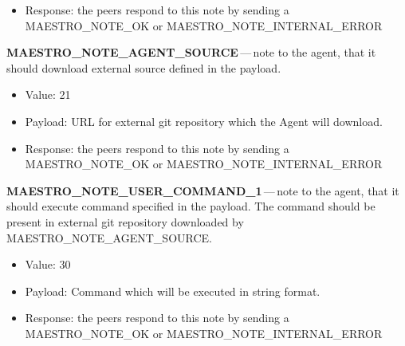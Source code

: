 \begin{description}
\begin{itemize}
    \item Response: the peers respond to this note by sending a MAESTRO\_NOTE\_OK or MAESTRO\_NOTE\_INTERNAL\_ERROR
  \end{itemize}
  \item \textbf{MAESTRO\_NOTE\_AGENT\_SOURCE}\,---\,note to the agent, that it should download external source defined in the payload.
  \begin{itemize}
    \setlength\itemsep{0em}
    \item Value: 21
    \item Payload: URL for external git repository which the Agent will download.
    \item Response: the peers respond to this note by sending a MAESTRO\_NOTE\_OK or MAESTRO\_NOTE\_INTERNAL\_ERROR
  \end{itemize}
  \item \textbf{MAESTRO\_NOTE\_USER\_COMMAND\_1}\,---\,note to the agent, that it should execute command specified in the payload. The command should be present in external git repository downloaded by MAESTRO\_NOTE\_AGENT\_SOURCE.
  \begin{itemize}
    \setlength\itemsep{0em}
    \item Value: 30
    \item Payload: Command which will be executed in string format.
    \item Response: the peers respond to this note by sending a MAESTRO\_NOTE\_OK or MAESTRO\_NOTE\_INTERNAL\_ERROR
  \end{itemize}
\end{description}


